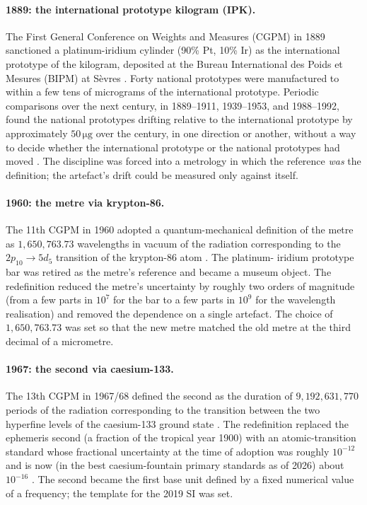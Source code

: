\paragraph{1889: the international prototype kilogram (IPK).} The
First General Conference on Weights and Measures (CGPM) in 1889
sanctioned a platinum-iridium cylinder (90\% Pt, 10\% Ir) as the
international prototype of the kilogram, deposited at the Bureau
International des Poids et Mesures (BIPM) at S\`evres
\cite{std:bipm-si2019}. Forty national prototypes were manufactured
to within a few tens of micrograms of the international prototype.
Periodic comparisons over the next century, in 1889--1911,
1939--1953, and 1988--1992, found the national prototypes drifting
relative to the international prototype by approximately $50 \,\si
{\micro\gram}$ over the century, in one direction or another,
without a way to decide whether the international prototype or the
national prototypes had moved
\cite{web:bipm-kilogram-history}. The discipline was forced into
a metrology in which the reference \emph{was} the definition; the
artefact's drift could be measured only against itself.

\paragraph{1960: the metre via krypton-86.} The 11th CGPM in 1960
adopted a quantum-mechanical definition of the metre as
$1{,}650{,}763.73$ wavelengths in vacuum of the radiation
corresponding to the $2p_{10} \to 5d_{5}$ transition of the
krypton-86 atom \cite{web:ch02t3-bipm-cgpm-1960}. The platinum-
iridium prototype bar was retired as the metre's reference and
became a museum object. The redefinition reduced the metre's
uncertainty by roughly two orders of magnitude (from a few parts in
$10^{7}$ for the bar to a few parts in $10^{9}$ for the wavelength
realisation) and removed the dependence on a single artefact. The
choice of $1{,}650{,}763.73$ was set so that the new metre matched
the old metre at the third decimal of a micrometre.

\paragraph{1967: the second via caesium-133.} The 13th CGPM in
1967/68 defined the second as the duration of $9{,}192{,}631{,}770$
periods of the radiation corresponding to the transition between
the two hyperfine levels of the caesium-133 ground state
\cite{web:ch02t3-bipm-cgpm-1967}. The redefinition replaced the
ephemeris second (a fraction of the tropical year 1900) with an
atomic-transition standard whose fractional uncertainty at the time
of adoption was roughly $10^{-12}$ and is now (in the best
caesium-fountain primary standards as of 2026) about $10^{-16}$
\cite{web:nist-cesium-fountain}. The second became the first base
unit defined by a fixed numerical value of a frequency; the
template for the 2019 SI was set.

